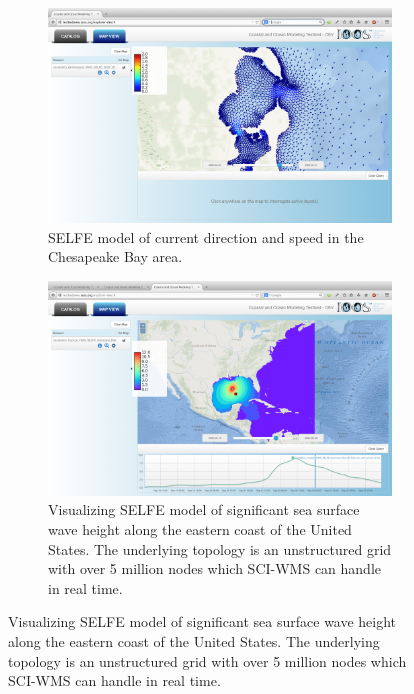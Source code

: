 \begin{figure}[ht!]
  \begin{subfigure}[t]{0.45\textwidth}
    \centering
    \includegraphics[width=\columnwidth]{../figs/vims_selfe_ubaratropic_vbaratropic_chesapeake_bay}
    \caption{SELFE model of current
      direction and speed in the Chesapeake Bay area.}
    \label{fig:vims_selfe_chesapeake}
  \end{subfigure}
  \begin{subfigure}[t]{0.45\textwidth}
    \centering
    \includegraphics[width=\columnwidth]{../figs/inundation_tropical_VIMS_SELFE_hurricane_rita_2d_final_run_with_waves_sea_surface_wave_significant_height}
    \caption{Visualizing SELFE model of significant sea surface wave height along the eastern coast of the United States. The underlying topology is an unstructured grid with over 5 million nodes which SCI-WMS can handle in real time.}
    \label{fig:vims_selfe_ssh}
  \end{subfigure}
\end{figure}
